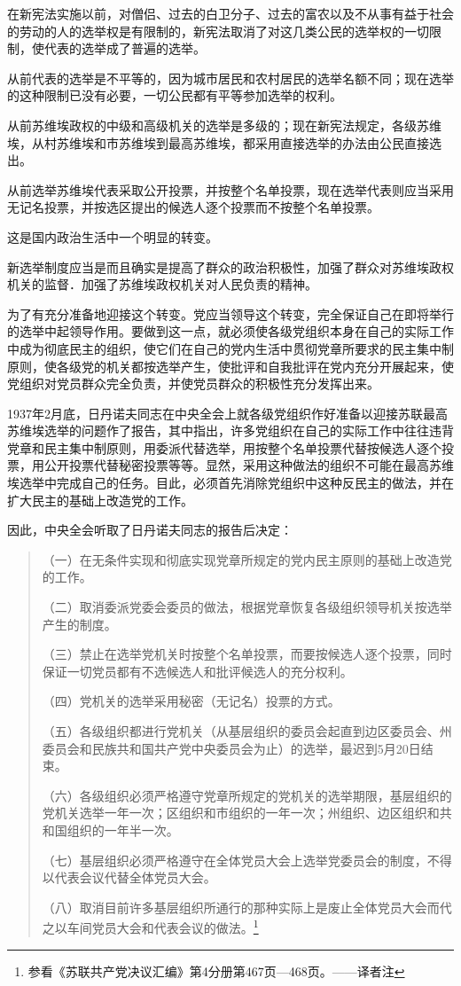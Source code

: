 在新宪法实施以前，对僧侣、过去的白卫分子、过去的富农以及不从事有益于社会的劳动的人的选举权是有限制的，新宪法取消了对这几类公民的选举权的一切限制，使代表的选举成了普遍的选举。

从前代表的选举是不平等的，因为城市居民和农村居民的选举名额不同；现在选举的这种限制已没有必要，一切公民都有平等参加选举的权利。

从前苏维埃政权的中级和高级机关的选举是多级的；现在新宪法规定，各级苏维埃，从村苏维埃和市苏维埃到最高苏维埃，都采用直接选举的办法由公民直接选出。

从前选举苏维埃代表采取公开投票，并按整个名单投票，现在选举代表则应当采用无记名投票，并按选区提出的候选人逐个投票而不按整个名单投票。

这是国内政治生活中一个明显的转变。

新选举制度应当是而且确实是提高了群众的政治积极性，加强了群众对苏维埃政权机关的监督．加强了苏维埃政权机关对人民负责的精神。

为了有充分准备地迎接这个转变。党应当领导这个转变，完全保证自己在即将举行的选举中起领导作用。要做到这一点，就必须使各级党组织本身在自己的实际工作中成为彻底民主的组织，使它们在自己的党内生活中贯彻党章所要求的民主集中制原则，使各级党的机关都按选举产生，使批评和自我批评在党内充分开展起来，使党组织对党员群众完全负责，并使党员群众的积极性充分发挥出来。

1937年2月底，日丹诺夫同志在中央全会上就各级党组织作好准备以迎接苏联最高苏维埃选举的问题作了报告，其中指出，许多党组织在自己的实际工作中往往违背党章和民主集中制原则，用委派代替选举，用按整个名单投票代替按候选人逐个投票，用公开投票代替秘密投票等等。显然，采用这种做法的组织不可能在最高苏维埃选举中完成自己的任务。目此，必须首先消除党组织中这种反民主的做法，并在扩大民主的基础上改造党的工作。

因此，中央全会听取了日丹诺夫同志的报告后决定：

\begin{quotation}
（一）在无条件实现和彻底实现党章所规定的党内民主原则的基础上改造党的工作。

（二）取消委派党委会委员的做法，根据党章恢复各级组织领导机关按选举产生的制度。

（三）禁止在选举党机关时按整个名单投票，而要按候选人逐个投票，同时保证一切党员都有不选候选人和批评候选人的充分权利。

（四）党机关的选举采用秘密（无记名）投票的方式。

（五）各级组织都进行党机关（从基层组织的委员会起直到边区委员会、州委员会和民族共和国共产党中央委员会为止）的选举，最迟到5月20日结束。

（六）各级组织必须严格遵守党章所规定的党机关的选举期限，基层组织的党机关选举一年一次；区组织和市组织的一年一次；州组织、边区组织和共和国组织的一年半一次。

（七）基层组织必须严格遵守在全体党员大会上选举党委员会的制度，不得以代表会议代替全体党员大会。

（八）取消目前许多基层组织所通行的那种实际上是废止全体党员大会而代之以车间党员大会和代表会议的做法。\footnote{参看《苏联共产党决议汇编》第4分册第467页—468页。——译者注}
\end{quotation}

